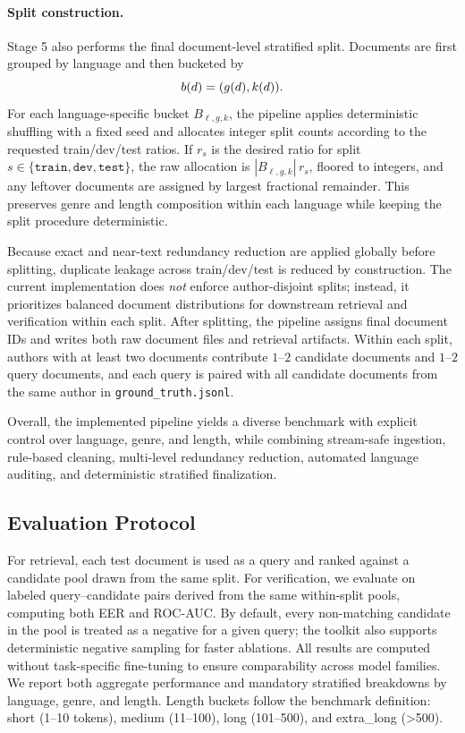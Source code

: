 \documentclass{article}
\newcommand{\rev}[1]{#1}
\begin{document}
\paragraph{Split construction.}
\label{subsec:construct-splits}
{\color{red}Stage 5 also performs the final document-level stratified split. Documents are first grouped by language and then bucketed by}
\[
{\color{red}
b(d)=(g(d),k(d)).
}
\]
{\color{red}For each language-specific bucket $B_{\ell,g,k}$, the pipeline applies deterministic shuffling with a fixed seed and allocates integer split counts according to the requested train/dev/test ratios. If $r_s$ is the desired ratio for split $s\in\{\texttt{train},\texttt{dev},\texttt{test}\}$, the raw allocation is $|B_{\ell,g,k}|\,r_s$, floored to integers, and any leftover documents are assigned by largest fractional remainder. This preserves genre and length composition within each language while keeping the split procedure deterministic.}

{\color{red}Because exact and near-text redundancy reduction are applied globally before splitting, duplicate leakage across train/dev/test is reduced by construction. The current implementation does \emph{not} enforce author-disjoint splits; instead, it prioritizes balanced document distributions for downstream retrieval and verification within each split. After splitting, the pipeline assigns final document IDs and writes both raw document files and retrieval artifacts. Within each split, authors with at least two documents contribute $1$--$2$ candidate documents and $1$--$2$ query documents, and each query is paired with all candidate documents from the same author in \texttt{ground\_truth.jsonl}.}

{\color{red}Overall, the implemented pipeline yields a diverse benchmark with explicit control over language, genre, and length, while combining stream-safe ingestion, rule-based cleaning, multi-level redundancy reduction, automated language auditing, and deterministic stratified finalization.}


\subsection{Evaluation Protocol}
\label{subsec:eval-protocol}
For retrieval, each test document is used as a query and ranked against a candidate pool drawn from the same split.
\rev{For verification, we evaluate on labeled query--candidate pairs derived from the same within-split pools, computing both EER and ROC-AUC.}
\rev{By default, every non-matching candidate in the pool is treated as a negative for a given query; the toolkit also supports deterministic negative sampling for faster ablations.}
All results are computed without task-specific fine-tuning to ensure comparability across model families.
We report both aggregate performance and mandatory stratified breakdowns by language, genre, and length.
Length buckets follow the benchmark definition: short (1--10 tokens), medium (11--100), long (101--500), and extra\_long (>500).
\end{document}

